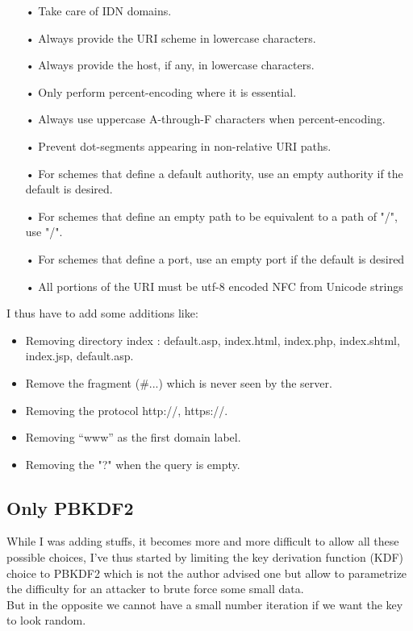 \documentclass{eplmastersthesis}
\begin{document}
\begin{itemize}
\item[•] Take care of IDN domains.
\item[•] Always provide the URI scheme in lowercase characters.
\item[•] Always provide the host, if any, in lowercase characters.
\item[•] Only perform percent-encoding where it is essential.
\item[•] Always use uppercase A-through-F characters when percent-encoding.
\item[•] Prevent dot-segments appearing in non-relative URI paths.
\item[•] For schemes that define a default authority, use an empty authority if the default is desired.
\item[•] For schemes that define an empty path to be equivalent to a path of "/", use "/".
\item[•] For schemes that define a port, use an empty port if the default is desired
\item[•] All portions of the URI must be utf-8 encoded NFC from Unicode strings
\end{itemize}

I thus have to add some additions like:
\begin{itemize}
\item Removing directory index : {default.asp, index.html, index.php, index.shtml, index.jsp, default.asp}.
\item Remove the fragment (\#...) which is never seen by the server.
\item Removing the protocol {http://, https://}.
\item Removing  “www” as the first domain label.
\item Removing the "?" when the query is empty.
\end{itemize}

\subsection{Only PBKDF2}
While I was adding stuffs, it becomes more and more difficult to allow all these possible choices, I've thus started by limiting the key derivation function (KDF) choice to PBKDF2 which is not the author advised one but allow to parametrize the difficulty for an attacker to brute force some small data.\\
But in the opposite we cannot have a small number iteration if we want the key to look random.
\end{document}
